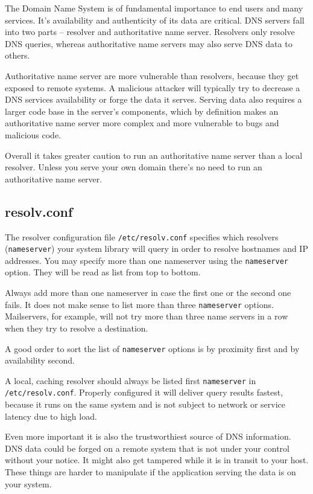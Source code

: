 The Domain Name System is of fundamental importance to end users and many
services. It's availability and authenticity of its data are critical. DNS
servers fall into two parts -- resolver and authoritative name server.
Resolvers only resolve DNS queries, whereas authoritative name servers may also
serve DNS data to others.

Authoritative name server are more vulnerable than resolvers, because they get
exposed to remote systems. A malicious attacker will typically try to decrease
a DNS services availability or forge the data it serves. Serving data also
requires a larger code base in the server's components, which by definition
makes an authoritative name server more complex and more vulnerable to bugs and
malicious code.

Overall it takes greater caution to run an authoritative name server than a
local resolver. Unless you serve your own domain there's no need to run an
authoritative name server.

\subsection{resolv.conf}

The resolver configuration file \verb|/etc/resolv.conf| specifies which
resolvers (\verb|nameserver|) your system library will query in order to resolve
hostnames and IP addresses. You may specify more than one nameserver using the
\verb|nameserver| option. They will be read as list from top to bottom.

Always add more than one nameserver in case the first one or the second one
fails. It does not make sense to list more than three \verb|nameserver| options.
Mailservers, for example, will not try more than three name servers in a row
when they try to resolve a destination.

A good order to sort the list of \verb|nameserver| options is by proximity
first and by availability second.

A local, caching resolver should always be listed first \verb|nameserver| in
\verb|/etc/resolv.conf|. Properly configured it will deliver query results
fastest, because it runs on the same system and is not subject to network or
service latency due to high load.

Even more important it is also the trustworthiest source of DNS information. DNS
data could be forged on a remote system that is not under your control without
your notice. It might also get tampered while it is in transit to your host.
These things are harder to manipulate if the application serving the data is on
your system.

